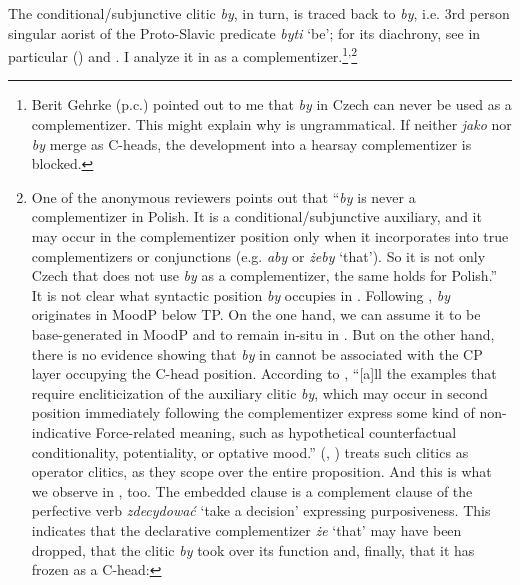 \documentclass[output=paper
,modfonts
,nonflat]{langsci/langscibook}
\begin{document}
The conditional\slash subjunctive clitic \emph{by}, in turn, is traced back to \*\emph{by}, i.e. 3rd person singular aorist of the Proto-Slavic predicate \*\emph{byti} `be'; for its diachrony, see in particular \citeauthor{Migdalski2016} (\citeyear{Migdalski2006, Migdalski2009, Migdalski2016}) and \textcite{Willis2000}. I analyze it in  as a complementizer.\footnote{Berit Gehrke (p.c.) pointed out to me that \emph{by} in Czech can never be used as a complementizer. This might explain why  is ungrammatical. If neither \emph{jako} nor \emph{by} merge as C-heads, the development into a hearsay complementizer is blocked.
}\textsuperscript{,}\footnote{One of the anonymous reviewers points out that ``\emph{by} is never a complementizer in Polish. It is a conditional\slash subjunctive auxiliary, and it may occur in the complementizer position only when it incorporates into true complementizers or conjunctions (e.g. \emph{aby} or \emph{żeby} `that'). So it is not only Czech that does not use \emph{by} as a complementizer, the same holds for Polish.'' It is not clear what syntactic position \emph{by} occupies in . Following \textcite{Migdalski2006}, \emph{by} originates in MoodP below TP. On the one hand, we can assume it to be base-generated in MoodP and to remain in-situ in . But on the other hand, there is no evidence showing that \emph{by} in   cannot be associated with the CP layer occupying the C-head position. According to  \textcite[171]{Migdalski2016}, ``[a]ll the examples that require encliticization of the auxiliary clitic \emph{by}, which may occur in second position immediately following the complementizer express some kind of non-indicative Force-related meaning, such as hypothetical counterfactual conditionality, potentiality, or optative mood.'' \citeauthor{Tomic2001} (\citeyear{Tomic2000}, \citeyear{Tomic2001}) treats such clitics as operator clitics, as they scope over the entire proposition. And this is what we observe in , too. The embedded clause is a complement clause of the perfective verb \emph{zdecydować} `take a decision' expressing purposiveness. This indicates that the declarative complementizer \emph{że} `that' may have been dropped, that the clitic \emph{by} took over its function and, finally, that it has frozen as a C-head:

}
\end{document}
